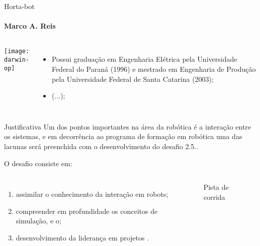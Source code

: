 \begin{frame}[t]{Horta-bot}
    \transboxout[duration=0.5]
    \framesubtitle{Marco A. Reis}
    \begin{columns}
            \texttt{[image: darwin-op]}
            \begin{itemize}
                \justifying
                \item Possui graduação em Engenharia Elétrica pela Universidade Federal do Paraná (1996) e mestrado em Engenharia de Produção pela Universidade Federal de Santa Catarina (2003);
                \item (...);
            \end{itemize}
    \end{columns}
\end{frame}

\begin{frame}[t]{Justificativa} 
    \transdissolve[duration=0.5]
    Um dos pontos importantes na área da robótica é a interação entre os sistemas, e em decorrência ao programa de formação em robótica uma das lacunas será preenchida com o desenvolvimento do desafio 2.5..

    O desafio consiste em:
        \begin{columns}[t]
                \begin{enumerate}
                    \item assimilar o conhecimento da interação em robots;
                    \item compreender em profundidade os conceitos de simulação, e o;
                    \item desenvolvimento da liderança em projetos \cite{Mohan2015}.
                \end{enumerate}
            \begin{center}
                \begin{figure}
                    \caption{Pista de corrida \cite{agostini2007}}
                \end{figure}
            \end{center}
        \end{columns}
\end{frame}

